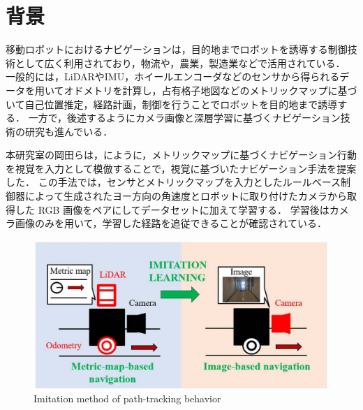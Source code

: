 
\section{背景}
移動ロボットにおけるナビゲーションは，目的地までロボットを誘導する制御技術として広く利用されており，物流や，農業，製造業などで活用されている．
一般的には，LiDARやIMU，ホイールエンコーダなどのセンサから得られるデータを用いてオドメトリを計算し，占有格子地図などのメトリックマップに基づいて自己位置推定，経路計画，制御を行うことでロボットを目的地まで誘導する．
一方で，後述するようにカメラ画像と深層学習に基づくナビゲーション技術の研究も進んでいる．

本研究室の岡田らは，にように，メトリックマップに基づくナビゲーション行動を視覚を入力として模倣することで，視覚に基づいたナビゲーション手法\cite{okada2020}\cite{okada2021}を提案した．
この手法では，センサとメトリックマップを入力としたルールベース制御器によって生成されたヨー方向の角速度とロボットに取り付けたカメラから取得した RGB 画像をペアにしてデータセットに加えて学習する．
学習後はカメラ画像のみを用いて，学習した経路を追従できることが確認されている．
\begin{figure}[htbp]
     \centering
     \includegraphics[width=130mm]{images/pdf/ishiguro/system.pdf}
     \caption{Imitation method of path-tracking behavior}
     \label{fig:imitation_sys}
\end{figure}

